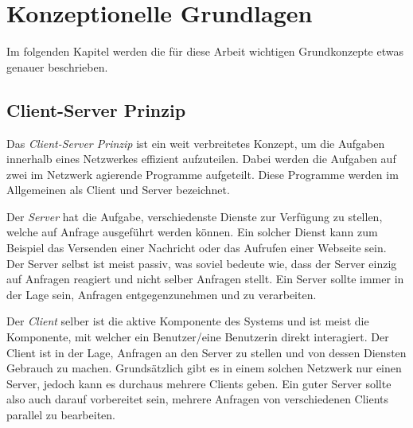 \documentclass[../main.tex]{subfiles}
\begin{document}
\chapter{Konzeptionelle Grundlagen} \label{konzepte}
Im folgenden Kapitel werden die für diese Arbeit wichtigen Grundkonzepte etwas genauer beschrieben.

\section{Client-Server Prinzip} \label{ClientServerPrinzip}
Das \emph{Client-Server Prinzip} ist ein weit verbreitetes Konzept, um die Aufgaben innerhalb eines Netzwerkes effizient aufzuteilen. Dabei werden die Aufgaben auf zwei im Netzwerk agierende Programme aufgeteilt. Diese Programme werden im Allgemeinen als Client und Server bezeichnet.
	
Der \emph{Server} hat die Aufgabe, verschiedenste Dienste zur Verfügung zu stellen, welche auf Anfrage ausgeführt werden können. Ein solcher Dienst kann zum Beispiel das Versenden einer Nachricht oder das Aufrufen einer Webseite sein. Der Server selbst ist meist passiv, was soviel bedeute wie, dass der Server einzig auf Anfragen reagiert und nicht selber Anfragen stellt. Ein Server sollte immer in der Lage sein, Anfragen entgegenzunehmen und zu verarbeiten.
	
Der \emph{Client} selber ist die aktive Komponente des Systems und ist meist die Komponente, mit welcher ein Benutzer/eine Benutzerin direkt interagiert. Der Client ist in der Lage, Anfragen an den Server zu stellen und von dessen Diensten Gebrauch zu machen. Grundsätzlich gibt es in einem solchen Netzwerk nur einen Server, jedoch kann es durchaus mehrere Clients geben. Ein guter Server sollte also auch darauf vorbereitet sein, mehrere Anfragen von verschiedenen Clients parallel zu bearbeiten. \cite{fachadmin.de:ServerClient}
	
	
\end{document}
